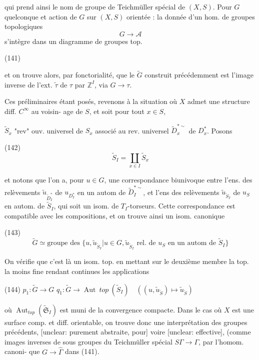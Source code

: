 qui prend ainsi le nom de groupe de
Teichmüller spécial de $(X,S)$. Pour
$G$ quelconque et action de $G$ sur
$(X,S)$ orientée : la donnée d'un hom.
de groupes topologiques
$$G \to \mathcal{A}$$
s'intègre dans un diagramme de
groupes top.

(141)

et on trouve alors, par fonctorialité,
que le $\tilde{G}$ construit précédemment
est l'image inverse de l'ext. $\tilde{\tau}$ de $\tau$
par $\mathbb{Z}^I$, via $G \to \tau$.

Ces préliminaires étant posés,
revenons à la situation où $X$
admet une structure diff. $C^\infty$ au voisin-
age de $S$, et soit pour tout $x \in S$,

\newpage


$\tilde{S}_x$ "rev" ouv. universel de $S_x$ associé au
rev. universel $\tilde{D}_x^{*\sim}$ de $D_x^*$. Posons

(142) $$ \tilde{S}_I = \coprod_{x \in I} \tilde{S}_x $$

et notons que l'on a, pour $u \in G$,
une correspondance biunivoque entre
l'ens. des relèvements $\tilde{u}_{\tilde{D}_I^*}$ de $u_{D_I^*}$
en un autom de $\tilde{D}_I^{*\sim}$, et l'ens des
relèvements $\tilde{u}_{\tilde{S}_I}$ de $u_S$ en autom. de $\tilde{S}_I$,
qui soit un isom. de $T_I$-torseurs.
Cette correspondance est compatible avec
les compositions, et on trouve ainsi
un isom. canonique

(143) $$ \tilde{G} \simeq \text{groupe des } \{ u, \tilde{u}_{\tilde{S}_I} | u \in G, \tilde{u}_{\tilde{S}_I} \text{ rel. de } u_S \text{ en un autom de } \tilde{S}_I \} $$

On vérifie que c'est là un isom.
top. en mettant sur le deuxième
membre la top. la moins fine rendant
continues les applications

(144) 
$p_1 : \tilde{G} \to G$
$q_1 : \tilde{G} \to \operatorname{Aut}\ top\ (\tilde{S}_I) \quad ( (u,\tilde{u}_{\tilde{S}}) \mapsto \tilde{u}_{\tilde{S}} )$

\newpage


où $\operatorname{Aut}_{top} (\tilde{\mathfrak{S}}_I)$ est muni de la
convergence compacte.
Dans le cas où $X$ est une surface comp. et diff.
orientable, on trouve donc une interprétation
des groupes précédents, [unclear: purement abstraite, pour]
voire [unclear: effective], (comme images
inverses de sous groupes du Teichmüller
spécial $S\Gamma \to \Gamma$, par l'homom. canoni-
que $G \to \hat{\Gamma}$ dans (141).
